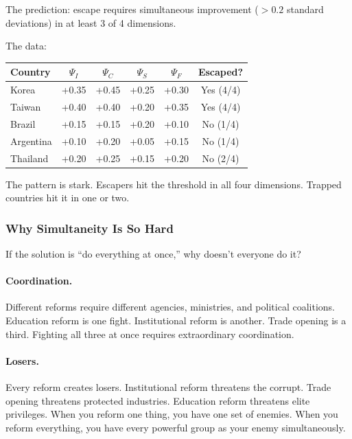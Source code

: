 The prediction: escape requires simultaneous improvement ($>0.2$ standard 
deviations) in at least 3 of 4 dimensions.

The data:

\begin{center}
\renewcommand{\arraystretch}{1.2}
\begin{tabular}{lccccc}
\hline
\textbf{Country} & $\Psi_I$ & $\Psi_C$ & $\Psi_S$ & $\Psi_F$ & \textbf{Escaped?} \\
\hline
Korea & +0.35 & +0.45 & +0.25 & +0.30 & Yes (4/4) \\
Taiwan & +0.40 & +0.40 & +0.20 & +0.35 & Yes (4/4) \\
Brazil & +0.15 & +0.15 & +0.20 & +0.10 & No (1/4) \\
Argentina & +0.10 & +0.20 & +0.05 & +0.15 & No (1/4) \\
Thailand & +0.20 & +0.25 & +0.15 & +0.20 & No (2/4) \\
\hline
\end{tabular}
\end{center}

The pattern is stark. Escapers hit the threshold in all four dimensions. 
Trapped countries hit it in one or two.

\subsubsection{Why Simultaneity Is So Hard}

If the solution is ``do everything at once,'' why doesn't everyone do it?

\paragraph{Coordination.}
Different reforms require different agencies, ministries, and political 
coalitions. Education reform is one fight. Institutional reform is another. 
Trade opening is a third. Fighting all three at once requires extraordinary 
coordination.

\paragraph{Losers.}
Every reform creates losers. Institutional reform threatens the corrupt. 
Trade opening threatens protected industries. Education reform threatens 
elite privileges. When you reform one thing, you have one set of enemies. 
When you reform everything, you have every powerful group as your enemy 
simultaneously.

